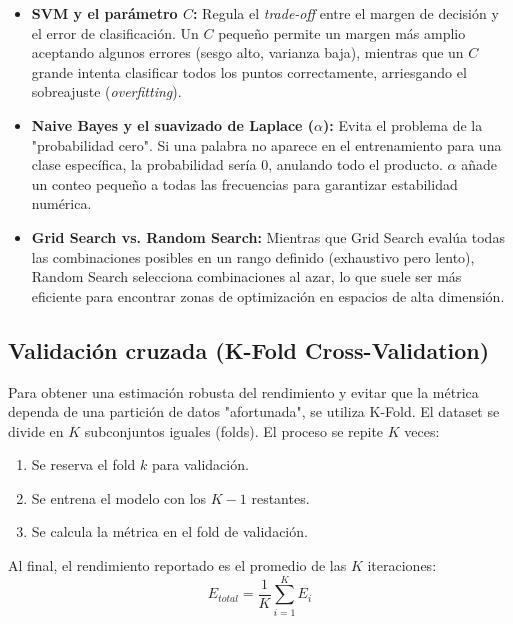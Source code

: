 \begin{itemize}
\item \textbf{SVM y el parámetro $C$:} Regula el \textit{trade-off} entre el margen de decisión y el error de clasificación. Un $C$ pequeño permite un margen más amplio aceptando algunos errores (sesgo alto, varianza baja), mientras que un $C$ grande intenta clasificar todos los puntos correctamente, arriesgando el sobreajuste (\textit{overfitting}).

\item \textbf{Naive Bayes y el suavizado de Laplace ($\alpha$):} Evita el problema de la "probabilidad cero". Si una palabra no aparece en el entrenamiento para una clase específica, la probabilidad sería $0$, anulando todo el producto. $\alpha$ añade un conteo pequeño a todas las frecuencias para garantizar estabilidad numérica.

\item \textbf{Grid Search vs. Random Search:} Mientras que Grid Search evalúa todas las combinaciones posibles en un rango definido (exhaustivo pero lento), Random Search selecciona combinaciones al azar, lo que suele ser más eficiente para encontrar zonas de optimización en espacios de alta dimensión.
\end{itemize}

\subsection{Validación cruzada (K-Fold Cross-Validation)}
Para obtener una estimación robusta del rendimiento y evitar que la métrica dependa de una partición de datos "afortunada", se utiliza K-Fold. El dataset se divide en $K$ subconjuntos iguales (folds). 
El proceso se repite $K$ veces:\begin{enumerate}
\item Se reserva el fold $k$ para validación.
\item Se entrena el modelo con los $K-1$ restantes.
\item Se calcula la métrica en el fold de validación.
\end{enumerate}
Al final, el rendimiento reportado es el promedio de las $K$ iteraciones:$$E_{total} = \frac{1}{K} \sum_{i=1}^{K} E_i$$


